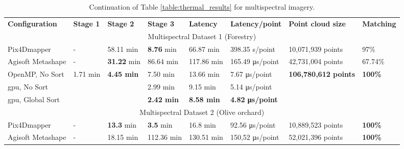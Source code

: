 \renewcommand{\arraystretch}{1.3}
\begin{table}
    \centering
    \footnotesize
    \caption{Continuation of Table \ref{table:thermal_results} for multispectral imagery.\\ }
    \label{table:multispectral_results}
    \begin{tabular}{l@{\hskip 0.25in}|lll|l|l|l|l}
    \toprule
    \textbf{Configuration} & \textbf{Stage 1} & \textbf{Stage 2} & \textbf{Stage 3} & \textbf{Latency} & \textbf{Latency/point} & \textbf{Point cloud size} & \textbf{Matching}\\
    \cmidrule{1-8}
    \multicolumn{8}{c}{Multispectral Dataset 1 (Forestry)}\\
    \cmidrule{1-8}
    Pix4Dmapper & - & 58.11 \si{\minute} & \textbf{8.76} \si{\minute} & 66.87 \si{\minute} & 398.35 \si{\second}/point & 10,071,939 points & 97\%\\
    Agisoft Metashape & - & \textbf{31.22} \si{\minute} & 86.64 \si{\minute} & 117.86 \si{\minute} & 165.49 \si{\micro\second}/point & 42,731,004 points & 67.74\%\\
    \cmidrule{1-8}
    OpenMP, No Sort & \multirow{\numExperiments}{*}{1.71 \si{\minute}} & \multirow{\numExperiments}{*}{\textbf{4.45 \si{\minute}}} & 7.50 \si{\minute} & 13.66 \si{\minute} & 7.67 \si{\micro\second}/point & \multirow{\numExperiments}{*}{\textbf{106,780,612 points}} & \multirow{\numExperiments}{*}{\textbf{100\%}}\\
    \acrshort{gpu}, No Sort & & & 2.99 \si{\minute} & 9.15 \si{\minute} & 5.14 \si{\micro\second}/point & &\\
    \acrshort{gpu}, Global Sort & & & \textbf{2.42 \si{\minute}} & \textbf{8.58 \si{\minute}} & \textbf{4.82 \si{\micro\second}/point} & &\\
    \bottomrule
    \toprule
    \multicolumn{8}{c}{Multispectral Dataset 2 (Olive orchard)}\\
    \cmidrule{1-8}
    Pix4Dmapper & - & \textbf{13.3} \si{\minute} & \textbf{3.5} \si{\minute} & 16.8 \si{\minute} & 92.56 \si{\micro\second}/point & 10,889,523 points & \textbf{100\%}\\
    Agisoft Metashape & - & 18.15 \si{\minute} & 112.36 \si{\minute} & 130.51 \si{\minute} & 150,52 \si{\micro\second}/point & 52,021,396 points & \textbf{100\%}\\

\end{tabular}
\end{table}
